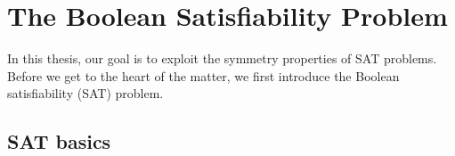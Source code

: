\chapter{The Boolean Satisfiability Problem}\label{chap:preliminaries}
\minitoc
In this thesis, our goal is to exploit the symmetry properties of SAT problems.
Before we get to the heart of the matter, we first introduce the Boolean satisfiability (SAT)  problem.
\section{SAT basics}

